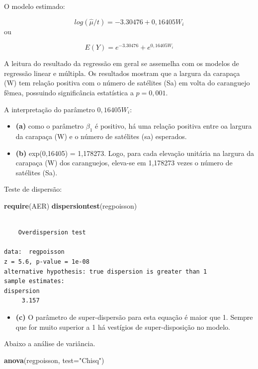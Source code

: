 \documentclass[12pt,brazil,oneside]{book}
\newenvironment{Shaded}{\begin{snugshade}}{\end{snugshade}}
\newcommand{\DataTypeTok}[1]{\textcolor[rgb]{0.13,0.29,0.53}{#1}}
\newcommand{\KeywordTok}[1]{\textcolor[rgb]{0.13,0.29,0.53}{\textbf{#1}}}
\newcommand{\NormalTok}[1]{#1}
\newcommand{\StringTok}[1]{\textcolor[rgb]{0.31,0.60,0.02}{#1}}
\providecommand{\tightlist}{%
  \setlength{\itemsep}{0pt}\setlength{\parskip}{0pt}}
\begin{document}
O modelo estimado:

\[
log(\hat\mu {/t}) = -3.30476 + 0,16405 W_i
\] ou

\[
E(Y)= e^{-3.30476} + e^{0,16405 W_i}
\]

A leitura do resultado da regressão em geral se assemelha com os modelos
de regressão linear e múltipla. Os resultados mostram que a largura da
carapaça (W) tem relação positiva com o número de satélites (Sa) em
volta do caranguejo fêmea, possuindo significância estatística a
\(p=0,001\).

A interpretação do parâmetro \(0,16405W_i\):

\begin{itemize}
\item
  \textbf{(a)} como o parâmetro \(\beta_1\) é positivo, há uma relação
  positiva entre oa largura da carapaça (W) e o número de satélites (sa)
  esperados.
\item
  \textbf{(b)} exp(0,16405) = 1,178273. Logo, para cada elevação
  unitária na largura da carapaça (W) dos caranguejos, eleva-se em
  1,178273 vezes o número de satélites (Sa).
\end{itemize}

Teste de dispersão:

\begin{Shaded}
\begin{Highlighting}[]
\KeywordTok{require}\NormalTok{(AER)}
\KeywordTok{dispersiontest}\NormalTok{(regpoisson)}
\end{Highlighting}
\end{Shaded}

\begin{verbatim}

    Overdispersion test

data:  regpoisson
z = 5.6, p-value = 1e-08
alternative hypothesis: true dispersion is greater than 1
sample estimates:
dispersion 
     3.157 
\end{verbatim}

\begin{itemize}
\tightlist
\item
  \textbf{(c)} O parâmetro de super-dispersão para esta equação é maior
  que 1. Sempre que for muito superior a 1 há vestígios de
  super-disposição no modelo.
\end{itemize}

Abaixo a análise de variância.

\begin{Shaded}
\begin{Highlighting}[]
\KeywordTok{anova}\NormalTok{(regpoisson, }\DataTypeTok{test=}\StringTok{"Chisq"}\NormalTok{)}
\end{Highlighting}
\end{Shaded}
\end{document}
